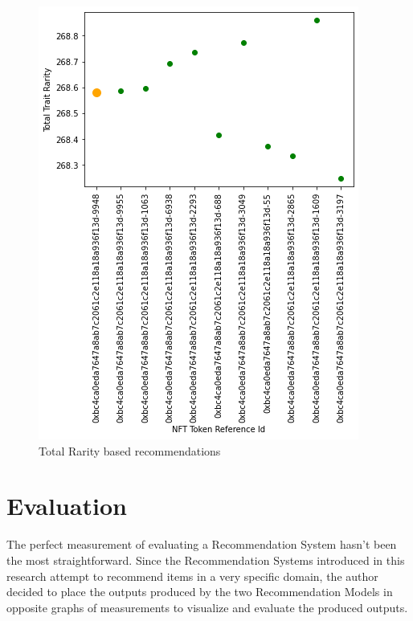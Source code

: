 \documentclass[conference]{IEEEtran}
\begin{document}
\begin{figure}[htbp]
\centerline{\includegraphics[width=\linewidth]{images/Trait_rarity_representation_graph-rarity_recommendations.png}}
\caption{Total Rarity based recommendations}
\label{fig:total-rarity-output}
\end{figure}

\section{Evaluation}
The perfect measurement of evaluating a Recommendation System hasn't been the most straightforward. Since the Recommendation Systems introduced in this research attempt to recommend items in a very specific domain, the author decided to place the outputs produced by the two Recommendation Models in opposite graphs of measurements to visualize and evaluate the produced outputs.
\end{document}
